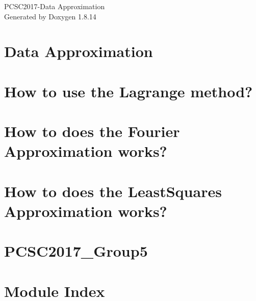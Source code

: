\documentclass[twoside]{book}
\newcommand{\+}{\discretionary{\mbox{\scriptsize$\hookleftarrow$}}{}{}}
\newcommand{\clearemptydoublepage}{%
  \newpage{\pagestyle{empty}\cleardoublepage}%
}
\begin{document}
\hypersetup{pageanchor=false,
             bookmarksnumbered=true,
             pdfencoding=unicode
            }
\begin{titlepage}
\vspace*{7cm}
\begin{center}%
{\Large P\+C\+S\+C2017-\/\+Data Approximation }\\
\vspace*{1cm}
{\large Generated by Doxygen 1.8.14}\\
\end{center}
\end{titlepage}
\clearemptydoublepage
{}
\tableofcontents
\clearemptydoublepage
{}
\hypersetup{pageanchor=true}

\chapter{Data Approximation}
\label{index}\hypertarget{index}{}
\chapter{How to use the Lagrange method?}
\label{_lagrange_polynomial}

\chapter{How to does the Fourier Approximation works?}
\label{_fourier_transforms}

\chapter{How to does the Least\+Squares Approximation works?}
\label{_least_squares}

\chapter{P\+C\+S\+C2017\+\_\+\+Group5}
\label{md___users_davidcleres__c_lion_projects__p_c_s_c2017__group5__r_e_a_d_m_e}

\chapter{Module Index}

\end{document}

